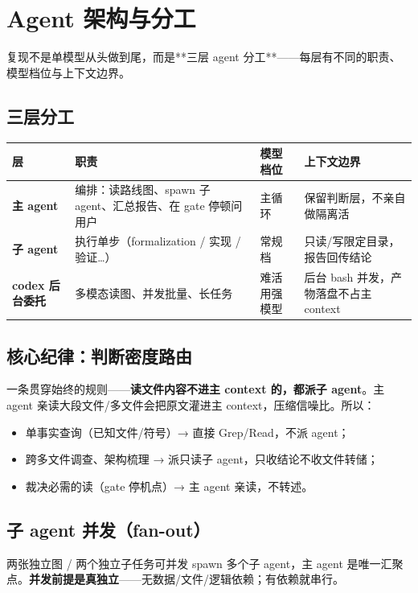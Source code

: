 \section{Agent 架构与分工}

复现不是单模型从头做到尾，而是**三层 agent 分工**——每层有不同的职责、模型档位与上下文边界。

\subsection{三层分工}

\begin{table}[H]
\centering\small
\begin{tabular}{@{}p{2.6cm}p{4.6cm}p{2.2cm}p{2.2cm}@{}}
\toprule
层 & 职责 & 模型档位 & 上下文边界 \\
\midrule
\textbf{主 agent} & 编排：读路线图、spawn 子 agent、汇总报告、在 gate 停顿问用户 & 主循环 & 保留判断层，不亲自做隔离活 \\
\textbf{子 agent} & 执行单步（formalization / 实现 / 验证…） & 常规档 & 只读/写限定目录，报告回传结论 \\
\textbf{codex 后台委托} & 多模态读图、并发批量、长任务 & 难活用强模型 & 后台 bash 并发，产物落盘不占主 context \\
\bottomrule
\end{tabular}
\end{table}

\subsection{核心纪律：判断密度路由}

一条贯穿始终的规则——\textbf{读文件内容不进主 context 的，都派子 agent}。主 agent 亲读大段文件/多文件会把原文灌进主 context，压缩信噪比。所以：

\begin{itemize}
  \item 单事实查询（已知文件/符号）→ 直接 Grep/Read，不派 agent；
  \item 跨多文件调查、架构梳理 → 派只读子 agent，只收结论不收文件转储；
  \item 裁决必需的读（gate 停机点）→ 主 agent 亲读，不转述。
\end{itemize}

\subsection{子 agent 并发（fan-out）}

两张独立图 / 两个独立子任务可并发 spawn 多个子 agent，主 agent 是唯一汇聚点。\textbf{并发前提是真独立}——无数据/文件/逻辑依赖；有依赖就串行。

